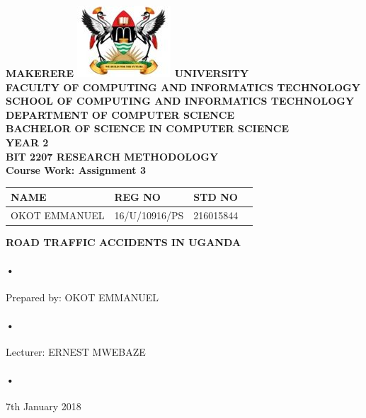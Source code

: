 \documentclass[12pt]{article}
\begin{document}
\begin{Huge}
\begin{center}
\begin{normalsize}
\textbf{MAKERERE \includegraphics[scale=0.5]{logo} UNIVERSITY }\\


\textbf{FACULTY OF COMPUTING AND INFORMATICS TECHNOLOGY} \\
\textbf{SCHOOL OF COMPUTING AND INFORMATICS TECHNOLOGY} \\
\textbf{DEPARTMENT OF COMPUTER SCIENCE} \\
\textbf{BACHELOR OF SCIENCE IN COMPUTER SCIENCE} \\
\textbf{YEAR 2} \\
\textbf{BIT 2207 RESEARCH METHODOLOGY} \\
\textbf{Course Work: Assignment 3}\\
\end{normalsize}
\end{center}
\end{Huge}

\begin{center}
\begin{tabular}{|l|l|l|c|}
\hline NAME  & REG NO & STD NO \\\hline
OKOT EMMANUEL& 16/U/10916/PS & 216015844 \\\hline
\end{tabular}

\end{center}

\newpage

\begin{center}
\textbf{ROAD TRAFFIC ACCIDENTS IN UGANDA}\\
\paragraph{•}
Prepared by: OKOT EMMANUEL\\
\paragraph{•}
Lecturer: ERNEST MWEBAZE \\
\paragraph{•}
7th January 2018

\end{center}
\end{document}
